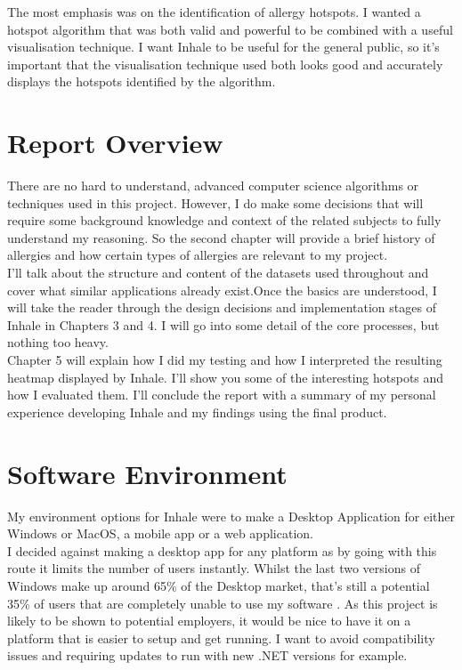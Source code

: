 The most emphasis was on the identification of allergy hotspots. I wanted a hotspot algorithm that was both valid and  powerful to be combined with a useful visualisation technique. I want Inhale to be useful for the general public, so it's important that the visualisation technique used both looks good and accurately displays the hotspots identified by the algorithm.\\


\section{Report Overview}

There are no hard to understand, advanced computer science algorithms or techniques used in this project. However, I do make some decisions that will require some background knowledge and context of the related subjects to fully understand my reasoning. So the second chapter will provide a brief history of allergies and how certain types of allergies are relevant to my project.\\

I'll talk about the structure and content of the datasets used throughout and cover what similar applications already exist.Once the basics are understood, I will take the reader through the design decisions and implementation stages of Inhale in Chapters 3 and 4. I will go into some detail of the core processes, but nothing too heavy.\\

Chapter 5 will explain how I did my testing and how I interpreted the resulting heatmap displayed by Inhale. I'll show you some of the interesting hotspots and how I evaluated them. I'll conclude the report with a summary of my personal experience developing Inhale and my findings using the final product.\\
    

\section{Software Environment}

My environment options for Inhale were to make a Desktop Application for either Windows or MacOS, a mobile app or a web application.\\

I decided against making a desktop app for any platform as by going with this route it limits the number of users instantly. Whilst the last two versions of Windows make up around 65\% of the Desktop market, that's still a potential 35\% of users that are completely unable to use my software \cite{windows}. As this project is likely to be shown to potential employers, it would be nice to have it on a platform that is easier to setup and get running. I want to avoid compatibility issues and requiring updates to run with new .NET versions for example.\\

